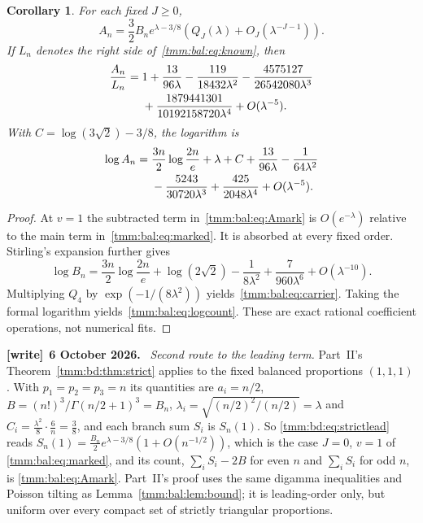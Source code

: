 \documentclass[11pt,letterpaper]{article}
\newtheorem{corollary}[theorem]{Corollary}
\theoremstyle{remark}\newtheorem{remark}[theorem]{Remark}
\newenvironment{writenote}[1][]{\par\smallskip\begingroup\small
 \noindent\textbf{[write]}\if\relax\detokenize{#1}\relax\else~\textbf{#1.}\fi\ }%
 {\par\endgroup\smallskip}
\begin{document}
\begin{corollary}\label{tmm:bal:cor:count}
For each fixed $J\ge0$,
\begin{equation}\label{tmm:bal:eq:count}
 A_n=\frac32B_ne^{\lambda-3/8}
          \left(Q_J(\lambda)+O_J(\lambda^{-J-1})\right).
\end{equation}
If $L_n$ denotes the right side of~\eqref{tmm:bal:eq:known}, then
\begin{align}
 \frac{A_n}{L_n}
 ={}&1+\frac{13}{96\lambda}-\frac{119}{18432\lambda^2}
       -\frac{4575127}{26542080\lambda^3}\notag\\
    &+\frac{1879441301}{10192158720\lambda^4}+O(\lambda^{-5}).\label{tmm:bal:eq:carrier}
\end{align}
With $C=\log(3\sqrt2)-3/8$, the logarithm is
\begin{align}
 \log A_n={}&\frac{3n}{2}\log\frac{2n}{e}+\lambda+C
  +\frac{13}{96\lambda}-\frac{1}{64\lambda^2}\notag\\
 &-\frac{5243}{30720\lambda^3}+\frac{425}{2048\lambda^4}
  +O(\lambda^{-5}).\label{tmm:bal:eq:logcount}
\end{align}
\end{corollary}
\begin{proof}
At $v=1$ the subtracted term in~\eqref{tmm:bal:eq:Amark} is $O(e^{-\lambda})$ relative to the main term in~\eqref{tmm:bal:eq:marked}. It is absorbed at every fixed order. Stirling's expansion further gives
\begin{equation}\label{tmm:bal:eq:logB}
 \log B_n=\frac{3n}{2}\log\frac{2n}{e}+\log(2\sqrt2)
        -\frac1{8\lambda^2}+\frac7{960\lambda^6}+O(\lambda^{-10}).
\end{equation}
Multiplying $Q_4$ by $\exp(-1/(8\lambda^2))$ yields~\eqref{tmm:bal:eq:carrier}. Taking the formal logarithm yields~\eqref{tmm:bal:eq:logcount}. These are exact rational coefficient operations, not numerical fits.
\end{proof}
\begin{writenote}[6 October 2026]
\emph{Second route to the leading term.} Part~II's Theorem~\ref{tmm:bd:thm:strict} applies to the fixed balanced proportions $(1,1,1)$. With $p_1=p_2=p_3=n$ its quantities are $a_i=n/2$, $B=(n!)^3/\Gamma(n/2+1)^3=B_n$, $\lambda_i=\sqrt{(n/2)^2/(n/2)}=\lambda$ and $C_i=\frac{\lambda^2}8\cdot\frac6n=\frac38$, and each branch sum $S_i$ is $S_n(1)$. So \eqref{tmm:bd:eq:strictlead} reads $S_n(1)=\frac{B_n}2e^{\lambda-3/8}(1+O(n^{-1/2}))$, which is the case $J=0$, $v=1$ of \eqref{tmm:bal:eq:marked}, and its count, $\sum_iS_i-2B$ for even $n$ and $\sum_iS_i$ for odd $n$, is \eqref{tmm:bal:eq:Amark}. Part~II's proof uses the same digamma inequalities and Poisson tilting as Lemma~\ref{tmm:bal:lem:bound}; it is leading-order only, but uniform over every compact set of strictly triangular proportions.
\end{writenote}
\end{document}

